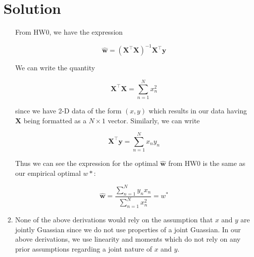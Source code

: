 \documentclass[submit]{../harvardml}
\newenvironment{solution}
  {\color{blue}\section*{Solution}}
{}
\begin{document}
\begin{solution}
\begin{enumerate}
        From HW0, we have the expression

        \[\bm{\hat w} = (\bm X^\top \bm X)^{-1}\bm X^\top \bm y\]

        We can write the quantity
        
        \[
        \bm X^\top \bm X = \sum_{n=1}^N x_n^2
        \]
        
        since we have 2-D data of the form $(x,y)$ which results in our data having $\bm X$ being formatted as a $N\times1$ vector. Similarly, we can write

        \[
        \bm X^\top \bm y = \sum_{n=1}^N x_ny_n
        \]

        Thus we can see the expression for the optimal $\bm{\hat{w}}$ from HW0 is the same as our empirical optimal $w*$:

        \[
        \bm{\hat w} = \frac{\sum_{n=1}^N y_n x_n}{\sum_{n=1}^N x_n^2} = w^*
        \]

        \item None of the above derivations would rely on the assumption that $x$ and $y$ are jointly Guassian since we do not use properties of a joint Guassian. In our above derivations, we use linearity and moments which do not rely on any prior assumptions regarding a joint nature of $x$ and $y$.        
	\end{enumerate}
\end{solution}

\end{document}
